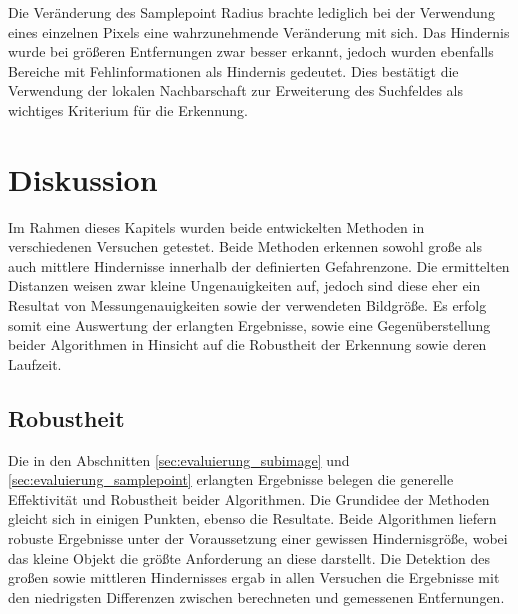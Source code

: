 \noindent
Die Veränderung des Samplepoint Radius brachte lediglich bei der Verwendung eines einzelnen Pixels eine wahrzunehmende Veränderung mit sich. Das Hindernis wurde bei größeren Entfernungen zwar besser erkannt, jedoch wurden ebenfalls Bereiche mit Fehlinformationen als Hindernis gedeutet. Dies bestätigt die Verwendung der lokalen Nachbarschaft zur Erweiterung des Suchfeldes als wichtiges Kriterium für die Erkennung.

\pagebreak
\section{Diskussion}
\label{sec:evaluation_Diskussion}

Im Rahmen dieses Kapitels wurden beide entwickelten Methoden in verschiedenen Versuchen getestet. Beide Methoden erkennen sowohl große als auch mittlere Hindernisse innerhalb der definierten Gefahrenzone. Die ermittelten Distanzen weisen zwar kleine Ungenauigkeiten auf, jedoch sind diese eher ein Resultat von Messungenauigkeiten sowie der verwendeten Bildgröße. Es erfolg somit eine Auswertung der erlangten Ergebnisse, sowie eine Gegenüberstellung beider Algorithmen in Hinsicht auf die Robustheit der Erkennung sowie deren Laufzeit.

\subsection{Robustheit}
\label{subsec:discussion_robustness}


Die in den Abschnitten \ref{sec:evaluierung_subimage} und \ref{sec:evaluierung_samplepoint} erlangten Ergebnisse belegen die generelle Effektivität und Robustheit beider Algorithmen. Die Grundidee der Methoden gleicht sich in einigen Punkten, ebenso die Resultate. Beide Algorithmen liefern robuste Ergebnisse unter der Voraussetzung einer gewissen Hindernisgröße, wobei das kleine Objekt die größte Anforderung an diese darstellt. Die Detektion des großen sowie mittleren Hindernisses ergab in allen Versuchen die Ergebnisse mit den niedrigsten Differenzen zwischen berechneten und gemessenen Entfernungen.

